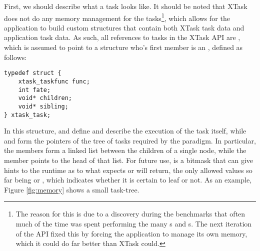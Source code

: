 \documentclass{article}
\begin{document}
First, we should describe what a task looks like. It should be noted that XTask does not do any memory management for the tasks\footnote{The reason for this is due to a discovery during the benchmarks that often much of the time was spent performing the many s and s. The next iteration of the API fixed this by forcing the application to manage its own memory, which it could do far better than XTask could.}, which allows for the application to build custom structures that contain both XTask task data and application task data. As such, all references to tasks in the XTask API are , which is assumed to point to a structure who's first member is an , defined as follows:
\begin{verbatim}
typedef struct {
    xtask_taskfunc func;
    int fate;
    void* children;
    void* sibling;
} xtask_task;
\end{verbatim}
In this structure,  and  define and describe the execution of the task itself, while  and  form the pointers of the tree of tasks required by the paradigm. In particular, the  members form a linked list between the children of a single node, while the  member points to the head of that list. For future use,  is a bitmask that can give hints to the runtime as to what  expects or will return, the only allowed values so far being  or , which indicates whether it is certain to leaf or not. As an example, Figure \ref{fig:memory} shows a small task-tree.
\end{document}
